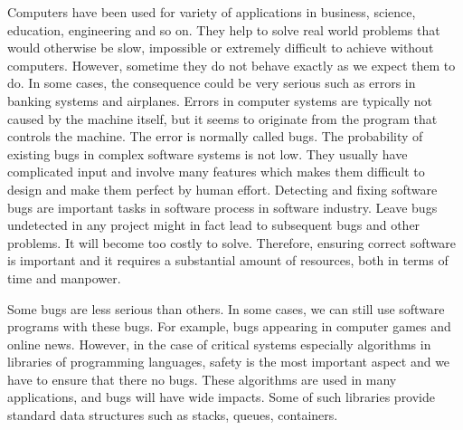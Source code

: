 \label{chapter:verification}

Computers have been used for variety of applications in business, science, education, engineering and so on. They help to solve real world problems that would otherwise be slow, impossible or extremely difficult to achieve without computers. However, sometime they do not behave exactly as we expect them to do. In some cases, the consequence could be very serious such as errors in banking systems and airplanes. Errors in computer systems are typically not caused by the machine itself, but it seems to originate from the program that controls the machine. The error is normally called bugs. 
%
The probability of existing bugs in complex software systems is not low. They usually have complicated input and involve many features which makes them difficult to design and make them perfect by human effort.
%
Detecting and fixing software bugs are important tasks in software process in software industry. Leave bugs undetected in any project might in fact lead to
subsequent bugs and other problems. It will
become too costly to solve. Therefore, ensuring correct software is important and it requires a substantial amount of
resources, both in terms of time and manpower.

%
%
%

Some bugs are less serious than others. In some cases, we can still use software programs with these bugs. For example, bugs appearing in computer games and online news. However, in the case of critical systems 
especially algorithms in libraries of programming languages, safety is the most important aspect and we have to ensure that there no bugs. These algorithms are used in many applications, and bugs will have wide impacts. Some of such libraries provide standard data structures such as stacks, queues, containers. 

